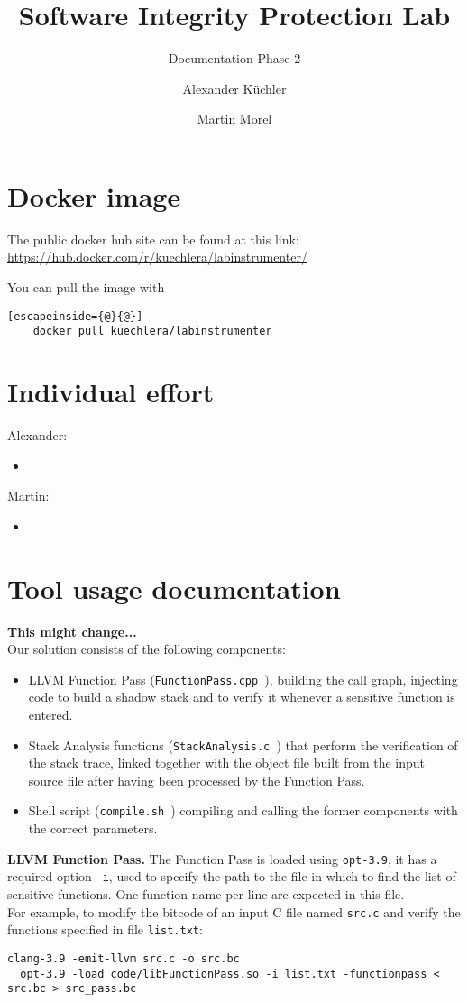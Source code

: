 \documentclass{llncs}
\title{Software Integrity Protection Lab}
\subtitle{Documentation Phase 2}
\author{Alexander K\"uchler \and Martin Morel}
\institute{Technical University of Munich\\
Department of Computer Science\\
\email{kuechler@in.tum.de}, \email{martin.morel@tum.de}}
\newcommand{\todo}[1]{\textbf{\color{red} #1}}
\newcommand{\llvmpass}{\texttt{FunctionPass.cpp }}
\newcommand{\stacka}{\texttt{StackAnalysis.c }}
\newcommand{\script}{\texttt{compile.sh }}
\begin{document}
\maketitle

\section{Docker image}
The public docker hub site can be found at this link: \url{https://hub.docker.com/r/kuechlera/labinstrumenter/}

You can pull the image with
\begin{lstlisting}[escapeinside={@}{@}]
    docker pull kuechlera/labinstrumenter
\end{lstlisting}

\section{Individual effort}
Alexander:
\begin{itemize}
  \item
\end{itemize}
Martin:
\begin{itemize}
  \item
\end{itemize}

\newpage

\section{Tool usage documentation}
\todo{This might change...}\\
Our solution consists of the following components:
\begin{itemize}
  \item LLVM Function Pass (\llvmpass), building the call graph, injecting code to build a shadow stack and to verify it whenever a sensitive function is entered.
  \item Stack Analysis functions (\stacka) that perform the verification of the stack trace, linked together with the object file built from the input source file after having been processed by the Function Pass.
  \item Shell script (\script) compiling and calling the former components with the correct parameters.
\end{itemize}

\noindent\textbf{LLVM Function Pass.}\newline
The Function Pass is loaded using \texttt{opt-3.9}, it has a required option \texttt{-i}, used to specify the path to the file in which to find the list of sensitive functions. One function name per line are expected in this file.\\
For example, to modify the bitcode of an input C file named \texttt{src.c} and verify the functions specified in file \texttt{list.txt}:
\begin{lstlisting}[basicstyle=\scriptsize]
  clang-3.9 -emit-llvm src.c -o src.bc
  opt-3.9 -load code/libFunctionPass.so -i list.txt -functionpass < src.bc > src_pass.bc
\end{lstlisting}
\end{document}
